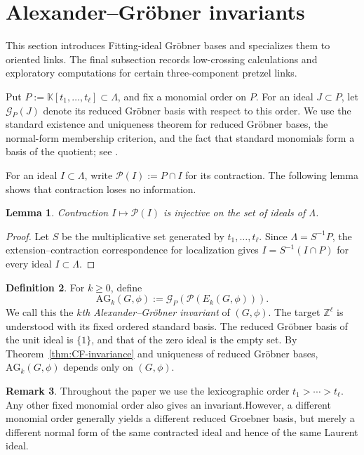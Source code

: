 \documentclass{article}
\theoremstyle{definition}
\newtheorem{definition}{Definition}[section]
\newtheorem{remark}[definition]{Remark}
\theoremstyle{plain}
\newtheorem{lemma}[definition]{Lemma}
\newcommand{\PP}{\mathcal{P}}
\newcommand{\AG}{\mathrm{AG}}
\newcommand{\Z}{\mathbb{Z}}
\newcommand{\K}{\mathbb{K}}
\begin{document}
\section{Alexander--Gr\"obner invariants}\label{sec:AG-definition}
This section introduces Fitting-ideal Gr\"obner bases and specializes
them to oriented links.  The final subsection records low-crossing
calculations and exploratory computations for certain three-component
pretzel links.


Put \(P:=\K[t_1,\dots,t_\ell]\subset\Lambda\), and fix a monomial order on
\(P\). For an ideal \(J\subset P\), let \(\mathcal G_P(J)\) denote its
reduced Gr\"obner basis with respect to this order. 
We use the standard existence and uniqueness theorem for reduced
Gr\"obner bases, the normal-form membership criterion, and the fact
that standard monomials form a basis of the quotient; see \cite[\S15]{Eis1}.

For an ideal \(I\subset\Lambda\), write \(\PP(I):=P\cap I\) for its
contraction. The following lemma shows that contraction loses no
information.

\begin{lemma}\label{lem:contraction-injective}
Contraction \(I\mapsto\PP(I)\) is injective on the set of ideals of
\(\Lambda\).
\end{lemma}

\begin{proof}
Let \(S\) be the multiplicative set generated by
\(t_1,\dots,t_\ell\). Since \(\Lambda=S^{-1}P\), the
extension--contraction correspondence for localization gives
\(I=S^{-1}(I\cap P)\) for every ideal \(I\subset\Lambda\).
\end{proof}

\begin{definition}\label{def:AG}
For \(k\ge0\), define
\[
\AG_k(G,\phi)
 :=\mathcal G_P\!\left(\PP(E_k(G,\phi))\right).
\]
We call this the \emph{\(k\)th Alexander--Gr\"obner invariant} of
\((G,\phi)\). The target \(\Z^\ell\) is understood with its fixed ordered
standard basis. The reduced Gr\"obner basis of the unit ideal is \(\{1\}\),
and that of the zero ideal is the empty set. By
Theorem~\ref{thm:CF-invariance} and uniqueness of reduced Gr\"obner bases,
\(\AG_k(G,\phi)\) depends only on \((G,\phi)\).
\end{definition}

\begin{remark}\label{rem:term-order}
Throughout the paper we use the lexicographic order
\(t_1>\cdots>t_\ell\). Any other fixed monomial order also gives an
invariant.However, a different monomial order generally yields a different reduced Groebner basis, but merely a different normal form of the same contracted ideal and hence of the same Laurent ideal.
\end{remark}
\end{document}
